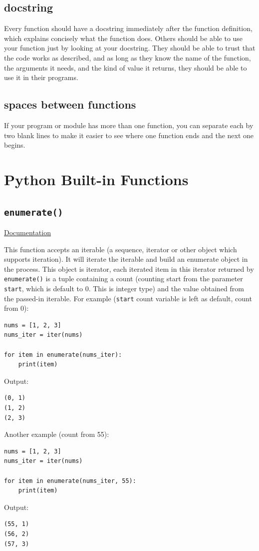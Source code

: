 \documentclass[12pt]{book}
\begin{document}
\subsection{docstring}
\label{sec:org0467944}
Every function should have a docstring immediately after the function definition, which explains concisely what the function does. Others should be able to use your function just by looking at your docstring. They should be able to trust that the code works as described, and as long as they know the name of the function, the arguments it needs, and the kind of value it returns, they should be able to use it in their programs.
\subsection{spaces between functions}
\label{sec:orgb07e051}
If your program or module has more than one function, you can separate each by two blank lines to make it easier to see where one function ends and the next one begins.
\section{Python Built-in Functions}
\label{sec:orgc9a76fb}
\subsection{\texttt{enumerate()}}
\label{sec:org6f2e240}
\href{https://docs.python.org/3/library/functions.html\#enumerate}{Documentation}

This function accepts an iterable (a sequence, iterator or other object which supports iteration). It will iterate the iterable and build an enumerate object in the process. This object is iterator, each iterated item in this iterator returned by \texttt{enumerate()} is a tuple containing a count (counting start from the parameter \texttt{start}, which is default to 0. This is integer type) and the value obtained from the passed-in iterable. For example (\texttt{start} count variable is left as default, count from 0):
\begin{verbatim}
nums = [1, 2, 3]
nums_iter = iter(nums)

for item in enumerate(nums_iter):
    print(item)
\end{verbatim}
Output:
\begin{verbatim}
(0, 1)
(1, 2)
(2, 3)
\end{verbatim}
Another example (count from 55):
\begin{verbatim}
nums = [1, 2, 3]
nums_iter = iter(nums)

for item in enumerate(nums_iter, 55):
    print(item)
\end{verbatim}
Output:
\begin{verbatim}
(55, 1)
(56, 2)
(57, 3)
\end{verbatim}
\end{document}
